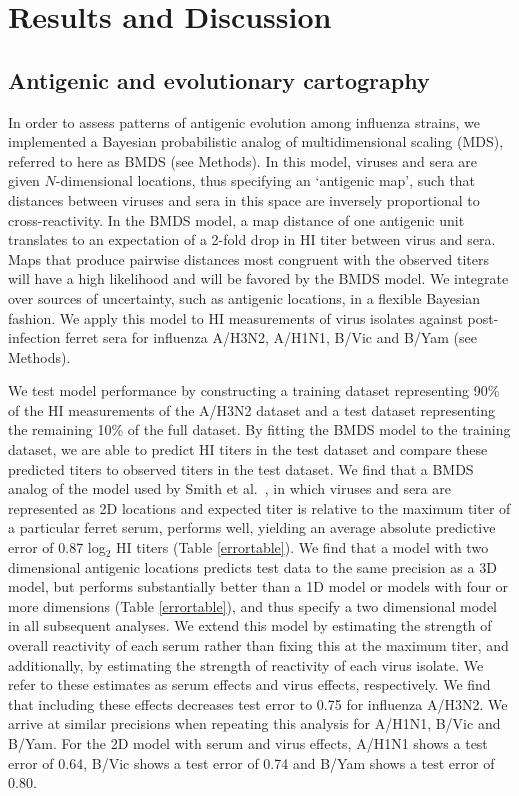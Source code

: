 \documentclass[11pt,oneside,letterpaper]{article}
\begin{document}
\section*{Results and Discussion}

\subsection*{Antigenic and evolutionary cartography}

In order to assess patterns of antigenic evolution among influenza strains, we implemented a Bayesian probabilistic analog of multidimensional scaling (MDS), referred to here as BMDS (see Methods).
In this model, viruses and sera are given $N$-dimensional locations, thus specifying an `antigenic map', such that distances between viruses and sera in this space are inversely proportional to cross-reactivity.
In the BMDS model, a map distance of one antigenic unit translates to an expectation of a 2-fold drop in HI titer between virus and sera.
Maps that produce pairwise distances most congruent with the observed titers will have a high likelihood and will be favored by the BMDS model.
We integrate over sources of uncertainty, such as antigenic locations, in a flexible Bayesian fashion.
We apply this model to HI measurements of virus isolates against post-infection ferret sera for influenza A/H3N2, A/H1N1, B/Vic and B/Yam (see Methods).

We test model performance by constructing a training dataset representing 90\% of the HI measurements of the A/H3N2 dataset and a test dataset representing the remaining 10\% of the full dataset. 
By fitting the BMDS model to the training dataset, we are able to predict HI titers in the test dataset and compare these predicted titers to observed titers in the test dataset. 
We find that a BMDS analog of the model used by Smith et al.\ \cite{Smith04}, in which viruses and sera are represented as 2D locations and expected titer is relative to the maximum titer of a particular ferret serum, performs well, yielding an average absolute predictive error of 0.87 log$_2$ HI titers (Table \ref{errortable}).
We find that a model with two dimensional antigenic locations predicts test data to the same precision as a 3D model, but performs substantially better than a 1D model or models with four or more dimensions (Table \ref{errortable}), and thus specify a two dimensional model in all subsequent analyses.
We extend this model by estimating the strength of overall reactivity of each serum rather than fixing this at the maximum titer, and additionally, by estimating the strength of reactivity of each virus isolate.
We refer to these estimates as serum effects and virus effects, respectively.
We find that including these effects decreases test error to 0.75 for influenza A/H3N2.
We arrive at similar precisions when repeating this analysis for A/H1N1, B/Vic and B/Yam.
For the 2D model with serum and virus effects, A/H1N1 shows a test error of 0.64, B/Vic shows a test error of 0.74 and B/Yam shows a test error of 0.80.
\end{document}
